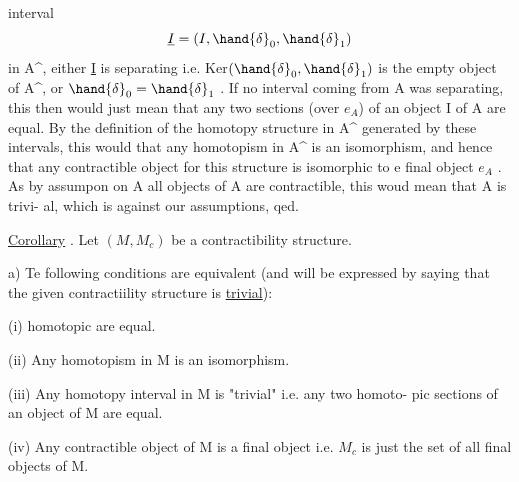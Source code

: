
interval
\[ \underline{I} = (I,\hand{\delta}_0,\hand{\delta}_1) \]
in A\^{}, either \underline{I} is separating i.e. Ker$(\hand{\delta}_0,\hand{\delta}_1)$ is the empty object of
A\^{}, or $\hand{\delta}_0 = \hand{\delta}_1$ . If no interval coming from A was separating, this
then would just mean that any two sections (over $e_{A\hat{}}$) of an object
I of A are equal. By the definition of the homotopy structure in A\^{}
generated by these intervals, this would  that any homotopism in
A\^{} is an isomorphism, and hence that any contractible object for this
structure is isomorphic to e final object $e_{A\hat{}}$ . As by assumpon on
A all objects of A are contractible, this woud mean that A is trivi-%
al, which is against our assumptions, qed.


\uline{Corollary} . Let $(M,M_c)$ be a contractibility structure.

a) Te following conditions are equivalent (and will be expressed
by saying that the given contractiility structure is \uline{trivial}):

(i)  homotopic are equal.

(ii) Any homotopism in M is an isomorphism.

(iii) Any homotopy interval in M is "trivial" i.e. any two homoto-%
pic sections of an object of M are equal.

(iv) Any contractible object of M is a final object i.e. $M_c$ is
just the set of all final objects of M.


